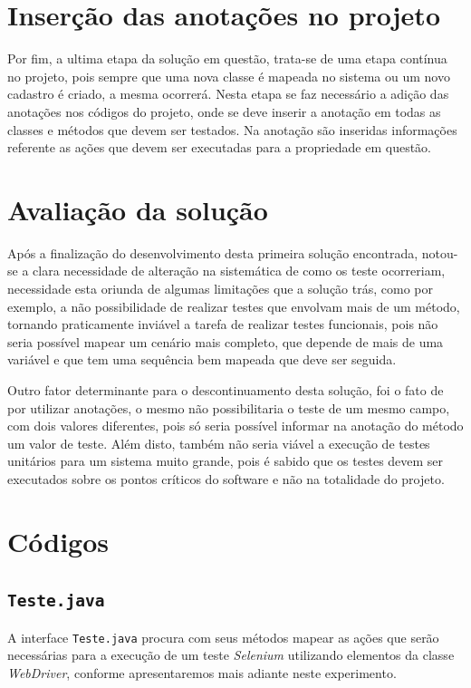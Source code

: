 \documentclass[tg]{mdtufsm}
\begin{document}
\section{Inserção das anotações no projeto}
Por fim, a ultima etapa da solução em questão, trata-se de uma etapa contínua no projeto, pois sempre que uma nova classe é mapeada no sistema ou um novo cadastro é criado, a mesma ocorrerá. Nesta etapa se faz necessário a adição das anotações nos códigos do projeto, onde se deve inserir a anotação em todas as classes e métodos que devem ser testados. Na anotação são inseridas informações referente as ações que devem ser executadas para a propriedade em questão.

\section{Avaliação da solução}
Após a finalização do desenvolvimento desta primeira solução encontrada, notou-se a clara necessidade de alteração na sistemática de como os teste ocorreriam, necessidade esta oriunda de algumas limitações que a solução trás, como por exemplo, a não possibilidade de realizar testes que envolvam mais de um método, tornando praticamente inviável a tarefa de realizar testes funcionais, pois não seria possível mapear um cenário mais completo, que depende de mais de uma variável e que tem uma sequência bem mapeada que deve ser seguida. 

Outro fator determinante para o descontinuamento desta solução, foi o fato de por utilizar anotações, o mesmo não possibilitaria o teste de um mesmo campo, com dois valores diferentes, pois só seria possível informar na anotação do método um valor de teste. Além disto, também não seria viável a execução de testes unitários para um sistema muito grande, pois é sabido que os testes devem ser executados sobre os pontos críticos do software e não na totalidade do projeto.


\section{Códigos}

\subsection{\texttt{Teste.java}}

A interface \texttt{Teste.java} procura com seus métodos mapear as ações que serão necessárias para a execução de um teste \emph{Selenium} utilizando elementos da classe \emph{WebDriver}, conforme apresentaremos mais adiante neste experimento.
\end{document}
